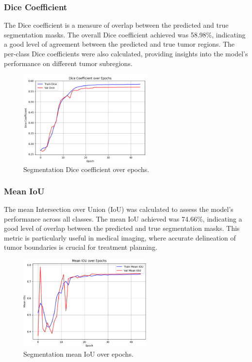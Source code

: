 \subsubsection{Dice Coefficient}
The Dice coefficient is a measure of overlap between the predicted and true segmentation masks. The overall Dice coefficient achieved was 58.98\%, indicating a good level of agreement between the predicted and true tumor regions. The per-class Dice coefficients were also calculated, providing insights into the model's performance on different tumor subregions.
\begin{figure}[h]
  \centering
  \includegraphics[width=0.6\textwidth]{Images/Chapter3/unet_dice.png}
  \caption{Segmentation Dice coefficient over epochs.}
  \label{fig:unet-dice}
\end{figure}

\subsubsection{Mean IoU}
The mean Intersection over Union (IoU) was calculated to assess the model's performance across all classes. The mean IoU achieved was 74.66\%, indicating a good level of overlap between the predicted and true segmentation masks. This metric is particularly useful in medical imaging, where accurate delineation of tumor boundaries is crucial for treatment planning.
\begin{figure}[h]
  \centering
  \includegraphics[width=0.6\textwidth]{Images/Chapter3/unet_iou.png}
  \caption{Segmentation mean IoU over epochs.}
  \label{fig:unet-iou}
\end{figure}

